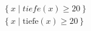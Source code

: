 \begin{align*}
  \left\lbrace x \mid tiefe(x) \geq 20 \right\rbrace \\
  \left\lbrace x \mid \text{tiefe}(x) \geq 20 \right\rbrace
\end{align*}